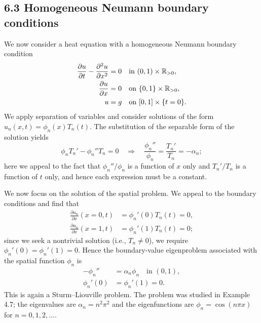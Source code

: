 \subsection{6.3 Homogeneous Neumann boundary conditions}
We now consider a heat equation with a homogeneous Neumann boundary condition
\begin{align*}
    \frac{\partial u}{\partial t} - \frac{\partial^2 u}{\partial x^2} &= 0 \quad \text{in } (0, 1) \times \mathbb{R}_{>0}, \\
    \frac{\partial u}{\partial x} &= 0 \quad \text{on } \{0, 1\} \times \mathbb{R}_{>0}, \\
    u &= g \quad \text{on } [0, 1] \times \{t = 0\}.
\end{align*}
We apply separation of variables and consider solutions of the form $u_n(x, t) = \phi_n(x) T_n(t)$. The substitution of the separable form of the solution yields
\[\phi_n T_n' - \phi_n'' T_n = 0 \quad \Rightarrow \quad \frac{\phi_n''}{\phi_n} = \frac{T_n'}{T_n} = -\alpha_n;\]
here we appeal to the fact that $\phi_n''/\phi_n$ is a function of $x$ only and $T_n'/T_n$ is a function of $t$ only, and hence each expression must be a constant.

We now focus on the solution of the spatial problem. We appeal to the boundary conditions and find that
\begin{align*}
    \frac{\partial u_n}{\partial x}(x = 0, t) &= \phi_n'(0) T_n(t) = 0, \\
    \frac{\partial u_n}{\partial x}(x = 1, t) &= \phi_n'(1) T_n(t) = 0;
\end{align*}
since we seek a nontrivial solution (i.e., $T_n \neq 0$), we require $\phi_n'(0) = \phi_n'(1) = 0$. Hence the boundary-value eigenproblem associated with the spatial function $\phi_n$ is
\begin{align*}
    -\phi_n'' &= \alpha_n \phi_n \quad \text{in } (0, 1), \\
    \phi_n'(0) &= \phi_n'(1) = 0.
\end{align*}
This is again a Sturm--Liouville problem. The problem was studied in Example 4.7; the eigenvalues are $\alpha_n = n^2\pi^2$ and the eigenfunctions are $\phi_n = \cos(n\pi x)$ for $n = 0, 1, 2, \dots$.

